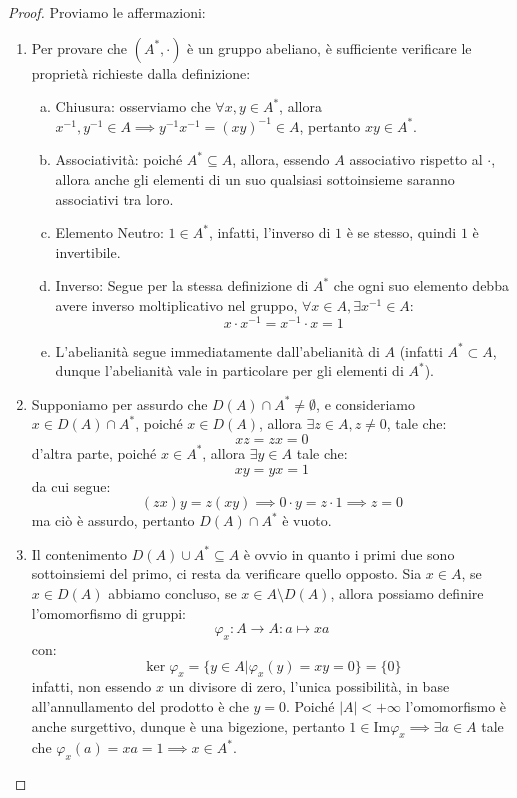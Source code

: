 \documentclass[11pt]{scrartcl}
\begin{document}
\begin{proof}
    Proviamo le affermazioni:
    \begin{enumerate}[(1)]
        \item Per provare che $(A^*, \cdot)$ è un gruppo abeliano, è sufficiente verificare le proprietà richieste dalla definizione:
        \begin{enumerate}[(a)]
            \item Chiusura: osserviamo che $\forall x,y \in A^*$, allora $x^{-1}, y^{-1} \in A \implies y^{-1}x^{-1} = (xy)^{-1} \in A$, pertanto $xy \in A^*$.
            \item Associatività: poiché $A^* \subseteq A$, allora, essendo $A$ associativo rispetto al $\cdot$, allora anche gli elementi di un suo qualsiasi sottoinsieme saranno associativi tra loro. 
            \item Elemento Neutro: $1 \in A^*$, infatti, l'inverso di $1$ è se stesso, quindi $1$ è invertibile.
            \item Inverso: Segue per la stessa definizione di $A^*$ che ogni suo elemento debba avere inverso moltiplicativo nel gruppo, 
	    $\forall x \in A, \exists x^{-1} \in A$:
                \[ x \cdot x^{-1} = x^{-1} \cdot x = 1
                \]
            \item L'abelianità segue immediatamente dall'abelianità di $A$ (infatti $A^* \subset A$, dunque l'abelianità vale in particolare per gli elementi di $A^*$).
        \end{enumerate}
        \item Supponiamo per assurdo che $D(A) \cap A^* \neq \emptyset$, e consideriamo $x \in D(A) \cap A^*$, poiché $x \in D(A)$, allora $\exists z \in A, z \ne 0$, tale che:
		    \[ xz = zx = 0
		        \]
            d'altra parte, poiché $x \in A^*$, allora $\exists y \in A$ tale che:
            \[  xy = yx = 1
                    \]
            da cui segue:
            \[ (zx)y = z(xy) \implies 0 \cdot y = z \cdot 1 \implies z = 0
                    \]
            ma ciò è assurdo, pertanto $D(A) \cap A^*$ è vuoto.
        \item Il contenimento $D(A) \cup A^* \subseteq A$ è ovvio in quanto i primi due sono sottoinsiemi del primo, ci resta da verificare quello opposto. Sia $x \in A$, se $x \in D(A)$ abbiamo concluso,
            se $x \in A \setminus D(A)$, allora possiamo definire l'omomorfismo di gruppi:
                \[ \varphi_x : A \longrightarrow A : a \longmapsto xa
                    \]
            con:
                \[ \ker \varphi_{x} = \{y \in A | \varphi_x(y) = xy = 0\} = \{0\}
                    \]
            infatti, non essendo $x$ un divisore di zero, l'unica possibilità, in base all'annullamento del prodotto è che $y = 0$. Poiché $|A| < +\infty$ l'omomorfismo è anche surgettivo, dunque è una bigezione,
            pertanto $1 \in \text{Im} \varphi_x \implies \exists a \in A$ tale che $\varphi_x(a) = xa = 1 \implies x \in A^*$.
    \end{enumerate}
\end{proof}
\end{document}
